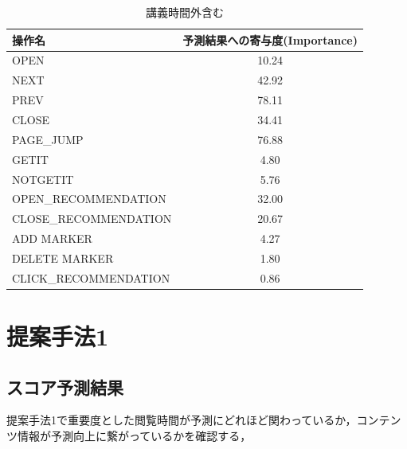 \documentclass[a4paper,12pt]{ltjsreport}
\begin{document}


\begin{table}[tbp]
  \centering
  \caption{講義時間外含む}
  \label{tb:Importance}
  \begin{tabular}{l|c}
    操作名 & 予測結果への寄与度(Importance) \\ \hline\hline
    OPEN & 10.24 \\ \hline
    NEXT & 42.92 \\ \hline
    PREV & 78.11 \\ \hline
    CLOSE & 34.41 \\ \hline
    PAGE\_JUMP & 76.88 \\ \hline
    GETIT & 4.80 \\ \hline
    NOTGETIT & 5.76 \\ \hline
    OPEN\_RECOMMENDATION & 32.00 \\ \hline
    CLOSE\_RECOMMENDATION & 20.67 \\ \hline
    ADD MARKER & 4.27 \\ \hline
    DELETE MARKER & 1.80 \\ \hline
    CLICK\_RECOMMENDATION & 0.86 \\ \hline
  \end{tabular}
\end{table}


\section{提案手法1}\label{sec:kekka1}

\subsection{スコア予測結果}

提案手法1で重要度とした閲覧時間が予測にどれほど関わっているか，コンテンツ情報が予測向上に繋がっているかを確認する，
\end{document}
